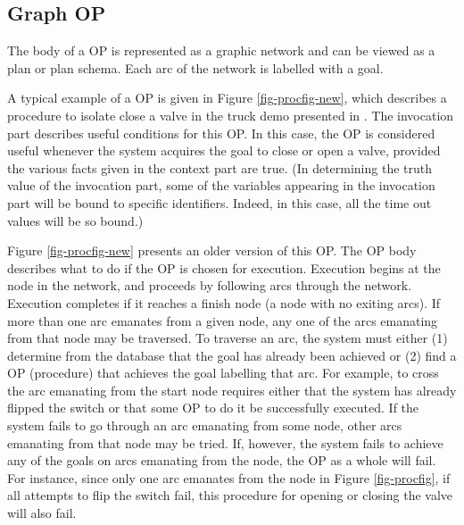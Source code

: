 \subsection{Graph OP}

The body of a OP is represented as a graphic network and can be viewed as a
plan or plan schema. Each arc of the network is labelled with a goal.


A typical example of a OP is given in Figure \ref{fig-procfig-new}, which
describes a procedure to isolate close a valve in the truck demo presented in
. The invocation part describes useful 
conditions for this OP. In this case, the OP is considered useful
whenever the system acquires the goal to close or open a valve, provided the
various facts given in the context part are true.  (In determining the truth
value of the invocation part, some of the variables appearing in the invocation
part will be bound to specific identifiers. Indeed, in this case, all the time
out values will be so bound.)



Figure \ref{fig-procfig-new} presents an older version of this OP. The OP body
describes what to do if the OP is chosen for execution.  Execution begins at
the  node in the network, and proceeds by following arcs through
the network. Execution completes if it reaches a finish node (a node with no
exiting arcs). If more than one arc emanates from a given node, any one of the
arcs emanating from that node may be traversed. To traverse an arc, the system
must either (1) determine from the database that the goal has already been
achieved or (2) find a OP (procedure) that achieves the goal labelling that
arc. For example, to cross the arc emanating from the start node requires
either that the system has already flipped the switch or that some OP to do it
be successfully executed. If the system fails to go through an arc emanating
from some node, other arcs emanating from that node may be tried.  If, however,
the system fails to achieve any of the goals on arcs emanating from the node,
the OP as a whole will fail. For instance, since only one arc emanates from the
 node in Figure \ref{fig-procfig}, if all attempts to flip the
switch fail, this procedure for opening or closing the valve will also fail.

